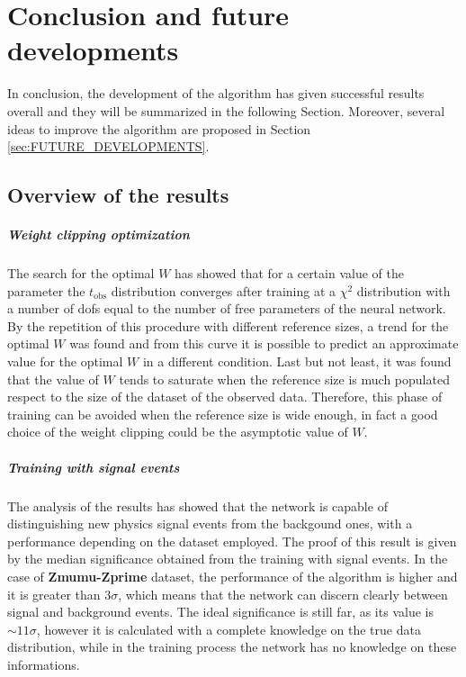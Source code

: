 \chapter{Conclusion and future developments}
\label{chap:CONCLUSION}




In conclusion, the development of the algorithm has given successful results overall and they will be summarized in the following Section. Moreover, several ideas to improve the algorithm are proposed in Section \ref{sec:FUTURE_DEVELOPMENTS}. 

\section{Overview of the results}
\label{sec:OVERVIEW}

\paragraph*{Weight clipping optimization}
The search for the optimal $W$ has showed that for a certain value of the parameter the $t_\mathrm{obs}$ distribution converges after training at a $\chi^2$ distribution with a number of dofs equal to the number of free parameters of the neural network. By the repetition of this procedure with different reference sizes, a trend for the optimal $W$ was found and from this curve it is possible to predict an approximate value for the optimal $W$ in a different condition. Last but not least, it was found that the value of $W$ tends to saturate when the reference size is much populated respect to the size of the dataset of the observed data. Therefore, this phase of training can be avoided when the reference size is wide enough, in fact a good choice of the weight clipping could be the asymptotic value of $W$.

\paragraph*{Training with signal events}
The analysis of the results has showed that the network is capable of distinguishing new physics signal events from the backgound ones, with a performance depending on the dataset employed. The proof of this result is given by the median significance obtained from the training with signal events. In the case of \textbf{Zmumu-Zprime} dataset, the performance of the algorithm is higher and it is greater than $3\sigma$, which means that the network can discern clearly between signal and background events. The ideal significance is still far, as its value is $\sim 11\sigma$, however it is calculated with a complete knowledge on the true data distribution, while in the training process the network has no knowledge on these informations.

